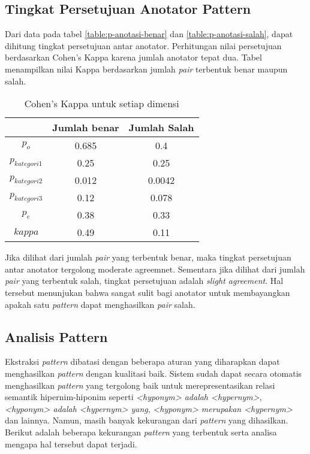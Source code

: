 \subsection{Tingkat Persetujuan Anotator Pattern}
Dari data pada tabel \ref{table:p-anotasi-benar} dan \ref{table:p-anotasi-salah}, dapat dihitung tingkat persetujuan antar anotator. Perhitungan nilai persetujuan berdasarkan Cohen's Kappa karena jumlah anotator tepat dua. Tabel menampilkan nilai Kappa berdasarkan jumlah \textit{pair} terbentuk benar maupun salah.

\begin{table}
  \centering
  \caption{Cohen's Kappa untuk setiap dimensi}
  \label{table:p-kappa}
  \begin{tabular}{|c|c|c|}
  \hline
  & Jumlah benar & Jumlah Salah \\ \hline
  $p_o$ & 0.685 & 0.4 \\ \hline
  $p_{kategori1}$ & 0.25 & 0.25 \\ \hline
  $p_{kategori2}$ & 0.012 & 0.0042 \\ \hline
  $p_{kategori3}$ & 0.12 & 0.078 \\ \hline
  $p_e$ & 0.38 & 0.33 \\ \hline
  $kappa$ & 0.49 & 0.11 \\ \hline 
  \end{tabular} 
\end{table}

Jika dilihat dari jumlah \textit{pair} yang terbentuk benar, maka tingkat persetujuan antar anotator tergolong {moderate agreemnet}. Sementara jika dilihat dari jumlah \textit{pair} yang terbentuk salah, tingkat persetujuan adalah \textit{slight agreement}. Hal tersebut menunjukan bahwa sangat sulit bagi anotator untuk membayangkan apakah satu \textit{pattern} dapat menghasilkan \textit{pair} salah.

\subsection{Analisis Pattern}
Ekstraksi \textit{pattern} dibatasi dengan beberapa aturan yang diharapkan dapat menghasilkan \textit{pattern} dengan kualitasi baik. Sistem sudah dapat secara otomatis menghasilkan \textit{pattern} yang tergolong baik untuk merepresentasikan relasi semantik hipernim-hiponim seperti \textit{<hyponym> adalah <hypernym>}, \textit{<hyponym> adalah <hypernym> yang}, \textit{<hyponym> merupakan <hypernym>} dan lainnya. Namun, masih banyak kekurangan dari \textit{pattern} yang dihasilkan. Berikut adalah beberapa kekurangan \textit{pattern} yang terbentuk serta analisa mengapa hal tersebut dapat terjadi.

